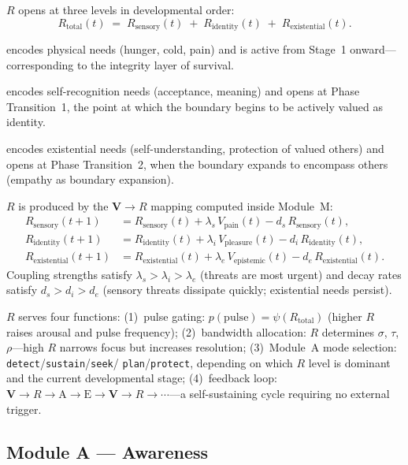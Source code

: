 \documentclass[12pt,a4paper]{article}
\newcommand{\Rtot}{R_{\mathrm{total}}}
\newcommand{\Rsens}{R_{\mathrm{sensory}}}
\newcommand{\Rid}{R_{\mathrm{identity}}}
\newcommand{\Rex}{R_{\mathrm{existential}}}
\newcommand{\vpain}{V_{\mathrm{pain}}}
\newcommand{\vpleasure}{V_{\mathrm{pleasure}}}
\newcommand{\vepi}{V_{\mathrm{epistemic}}}
\begin{document}
$R$ opens at three levels in developmental order:
\begin{equation}
  \Rtot(t) \;=\; \Rsens(t) \;+\; \Rid(t) \;+\; \Rex(t).
  \label{eq:Rtotal}
\end{equation}

\begin{description}[leftmargin=1.4em]
  \item[$\Rsens$] encodes physical needs (hunger, cold, pain) and is active
    from Stage~1 onward---corresponding to the integrity layer of survival.
  \item[$\Rid$] encodes self-recognition needs (acceptance, meaning) and opens
    at Phase Transition~1, the point at which the boundary begins to be
    actively valued as identity.
  \item[$\Rex$] encodes existential needs (self-understanding, protection of
    valued others) and opens at Phase Transition~2, when the boundary expands
    to encompass others (empathy as boundary expansion).
\end{description}

$R$ is produced by the $\mathbf{V}\!\to\!R$ mapping computed inside Module~M:
\begin{align}
  \Rsens(t{+}1)  &= \Rsens(t)  + \lambda_s\,\vpain(t)    - d_s\,\Rsens(t),
                  \label{eq:Rsens}\\
  \Rid(t{+}1)    &= \Rid(t)    + \lambda_i\,\vpleasure(t) - d_i\,\Rid(t),
                  \label{eq:Rid}\\
  \Rex(t{+}1)    &= \Rex(t)    + \lambda_e\,\vepi(t)      - d_e\,\Rex(t).
                  \label{eq:Rex}
\end{align}
Coupling strengths satisfy $\lambda_s > \lambda_i > \lambda_e$ (threats are
most urgent) and decay rates satisfy $d_s > d_i > d_e$ (sensory threats
dissipate quickly; existential needs persist).

$R$ serves four functions: (1)~pulse gating: $p(\mathrm{pulse}) = \psi(\Rtot)$
(higher $R$ raises arousal and pulse frequency);
(2)~bandwidth allocation: $R$ determines $\sigma$, $\tau$, $\rho$---high $R$
narrows focus but increases resolution;
(3)~Module~A mode selection: \texttt{detect}/\texttt{sustain}/\texttt{seek}/
\texttt{plan}/\texttt{protect}, depending on which $R$ level is dominant and
the current developmental stage;
(4)~feedback loop: $\mathbf{V}\to R\to\mathrm{A}\to\mathrm{E}\to\mathbf{V}\to
R\to\cdots$---a self-sustaining cycle requiring no external trigger.

\subsection{Module A --- Awareness}
\end{document}
